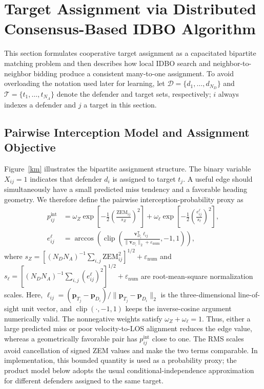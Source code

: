 \section{Target Assignment via Distributed Consensus-Based IDBO Algorithm}
\label{sec:target_assignment}

This section formulates cooperative target assignment as a capacitated bipartite matching
problem and then describes how local IDBO search and neighbor-to-neighbor bidding produce a
consistent many-to-one assignment. To avoid overloading the notation used later for learning,
let $\mathcal{D}=\{d_1,\ldots,d_{N_D}\}$ and
$\mathcal{T}=\{t_1,\ldots,t_{N_A}\}$ denote the defender and target sets, respectively;
$i$ always indexes a defender and $j$ a target in this section.

\subsection{Pairwise Interception Model and Assignment Objective}
\label{subsec:problem_formulation}

Figure~\ref{km} illustrates the bipartite assignment structure. The binary variable
$X_{ij}=1$ indicates that defender $d_i$ is assigned to target $t_j$. A useful edge should
simultaneously have a small predicted miss tendency and a favorable heading geometry. We
therefore define the pairwise interception-probability proxy as
\begin{equation}
\label{eq:pair_score}
\begin{aligned}
p_{ij}^{\mathrm{int}}
 &= \omega_Z\exp\!\left[-\frac{1}{2}
       \left(\frac{\mathrm{ZEM}_{ij}}{s_Z}\right)^2\right]
  + \omega_{\ell}\exp\!\left[-\frac{1}{2}
       \left(\frac{e_{ij}^{\ell}}{s_{\ell}}\right)^2\right],\\
e_{ij}^{\ell}
 &= \arccos\!\left(\operatorname{clip}\!\left(
 \frac{\mathbf v_{D_i}^{\mathsf T}\boldsymbol\ell_{ij}}
 {\|\mathbf v_{D_i}\|_2+\varepsilon_{\mathrm{num}}},-1,1\right)\right),
\end{aligned}
\end{equation}
where $s_Z=[(N_DN_A)^{-1}\sum_{i,j}\mathrm{ZEM}_{ij}^{2}]^{1/2}
+\varepsilon_{\mathrm{num}}$ and
$s_{\ell}=[(N_DN_A)^{-1}\sum_{i,j}(e_{ij}^{\ell})^{2}]^{1/2}
+\varepsilon_{\mathrm{num}}$ are root-mean-square normalization scales. Here,
$\boldsymbol\ell_{ij}=(\mathbf p_{T_j}-\mathbf p_{D_i})/
\|\mathbf p_{T_j}-\mathbf p_{D_i}\|_2$ is the three-dimensional line-of-sight unit vector,
and $\operatorname{clip}(\cdot,-1,1)$ keeps the inverse-cosine argument numerically valid.
The nonnegative weights satisfy $\omega_Z+\omega_{\ell}=1$.
Thus, either a large predicted miss or poor velocity-to-LOS alignment reduces the edge value,
whereas a geometrically favorable
pair has $p_{ij}^{\mathrm{int}}$ close to one. The RMS scales avoid cancellation of signed
ZEM values and make the two terms comparable. In implementation, this bounded quantity is
used as a probability proxy; the product model below adopts the usual conditional-independence
approximation for different defenders assigned to the same target.

